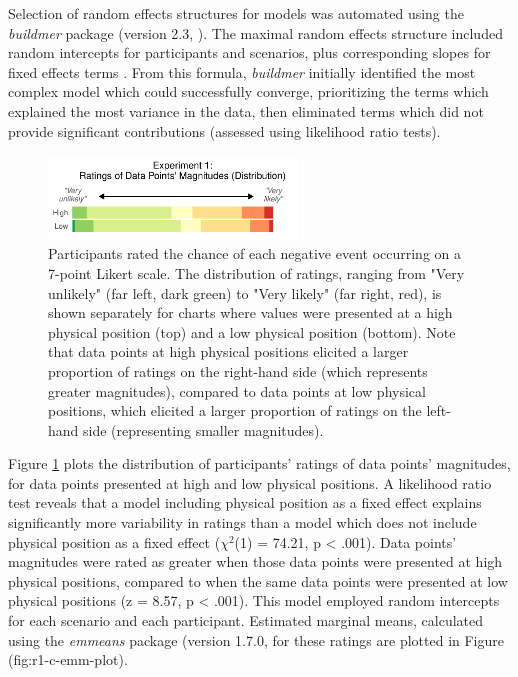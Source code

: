\documentclass[journal]{vgtc}                %
\begin{document}
Selection of random effects structures for models was automated using
the \emph{buildmer} package (version 2.3, \citep{voeten_buildmer_2022}). The maximal random
effects structure included random intercepts for participants and
scenarios, plus corresponding slopes for fixed effects terms
\citep{barr_random_2013}. From this formula, \emph{buildmer} initially identified
the most complex model which could successfully converge, prioritizing
the terms which explained the most variance in the data, then eliminated
terms which did not provide significant contributions (assessed using
likelihood ratio tests).

\begin{figure}
\includegraphics[width=250px]{position_magnitude_files/figure-latex/r1-c-plot-1} \caption{Participants rated the chance of each negative event occurring on a 7-point Likert scale. The distribution of ratings, ranging from "Very unlikely" (far left, dark green) to "Very likely" (far right, red), is shown separately for charts where values were presented at a high physical position (top) and a low physical position (bottom). Note that data points at high physical positions elicited a larger proportion of ratings on the right-hand side (which represents greater magnitudes), compared to data points at low physical positions, which elicited a larger proportion of ratings on the left-hand side (representing smaller magnitudes).}\label{fig:r1-c-plot}
\end{figure}

Figure \ref{fig:r1-c-plot} plots the distribution of participants'
ratings of data points' magnitudes, for data points presented at high
and low physical positions. A likelihood ratio test reveals that a model
including physical position as a fixed effect explains significantly
more variability in ratings than a model which does not include physical
position as a fixed effect (\(\chi^2\)(1) =
74.21, p \textless{} .001). Data
points' magnitudes were rated as greater when those data points were
presented at high physical positions, compared to when the same data
points were presented at low physical positions (z =
8.57, p
\textless{} .001). This model employed random
intercepts for each scenario and each participant. Estimated marginal
means, calculated using the \emph{emmeans} package (version 1.7.0, \citep{lenth_emmeans_2021} for these ratings are plotted in Figure \citet{ref}(fig:r1-c-emm-plot).
\end{document}
